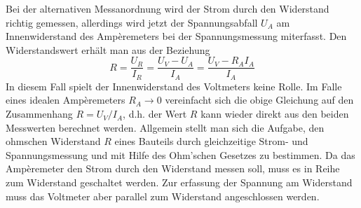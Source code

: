 \noindent Bei der alternativen Messanordnung wird der Strom durch den Widerstand richtig gemessen, allerdings wird jetzt der Spannungsabfall $U_A$ am Innenwiderstand des Ampèremeters bei der Spannungsmessung miterfasst. Den Widerstandswert erhält man aus der Beziehung
\begin{equation}
\boxed{R=\dfrac{U_R}{I_R}=\dfrac{U_V-U_A}{I_A}=\dfrac{U_V-R_AI_A}{I_A}}
\end{equation}
In diesem Fall spielt der Innenwiderstand des Voltmeters keine Rolle. Im Falle eines idealen Ampèremeters $R_A\rightarrow 0$ vereinfacht sich die obige Gleichung auf den Zusammenhang $R=U_V/I_A$, d.h. der Wert $R$ kann wieder direkt aus den beiden Messwerten berechnet werden.
\newline\newline
Allgemein stellt man sich die Aufgabe, den ohmschen Widerstand $R$ eines Bauteils durch gleichzeitige Strom- und Spannungsmessung und mit Hilfe des Ohm'schen Gesetzes zu bestimmen. Da das Ampèremeter den Strom durch den Widerstand messen soll, muss es in Reihe zum Widerstand geschaltet werden. Zur erfassung der Spannung am Widerstand muss das Voltmeter aber parallel zum Widerstand angeschlossen werden. 
